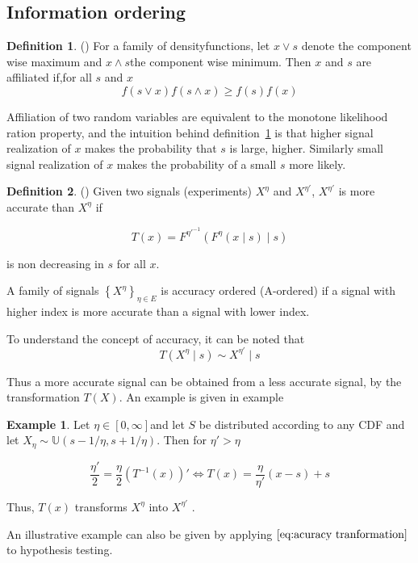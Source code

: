 \documentclass[10pt,a4paper]{article} %
\theoremstyle{definition}
\newtheorem{defn}{Definition}[section]
\newtheorem{example}{Example}[section]
\theoremstyle{remark}
\begin{document}

\subsection{Information ordering}

\begin{defn}
\label{def:afflilation} (\citet{Milgrom1982}) 
For a family of densityfunctions, let $x\lor s$ denote the component wise maximum and $x\land s$the component wise minimum. Then $x$ and $s$ are affiliated if,for all $s$ and $x$
\[
f(s\lor x)f(s\land x)\ge f(s)f(x)
\]
\end{defn}

Affiliation of two random variables are equivalent to the monotone likelihood ration property, and the intuition behind definition~\ref{def:afflilation} is that higher signal realization of $x$ makes the probability that $s$ is large, higher. Similarly small signal realization of $x$ makes the probability of a small $s$ more likely.

\begin{defn}\label{def:accuracy}
(\citet{Persico2000}) Given two signals
(experiments) $X^{\eta}$ and $X^{\eta'}$, $X^{\eta'}$ is more accurate than $X^{\eta}$ if

\begin{equation}
T(x)=F^{\eta'^{-1}}(F^{\eta}(x\mid s)\mid s)\label{eq:acuracy tranformation}
\end{equation}

is non decreasing in $s$ for all $x$.

A family of signals $\left\{ X^{\eta}\right\} _{\eta\in E}$ is accuracy ordered (A-ordered) if a signal with higher index is more accurate than a signal with lower index.
\end{defn}

To understand the concept of accuracy, it can be noted that
\[
T(X^{\eta}\mid s)\sim X^{\eta'}\mid s
\]

Thus a more accurate signal can be obtained from a less accurate signal, by the transformation $T(X)$. An example is given in example

\begin{example}
Let  $\eta\in[0,\infty]$and let $S$ be distributed according to any CDF and let $X_{\eta}\sim\mathbb{U}(s-1/\eta,s+1/\eta)$. Then for $\eta'>\eta$

\[
\frac{\eta'}{2}=\frac{\eta}{2}\left(T^{-1}(x)\right)'\Leftrightarrow T(x)=\frac{\eta}{\eta'}(x-s)+s
\]

Thus, $T(x)$ transforms $X^{\eta}$ into $X^{\eta'}$ \citep{Persico1996}.
\end{example}
An illustrative example can also be given by applying $\eqref{eq:acuracy tranformation}$ to hypothesis testing.
\end{document}
